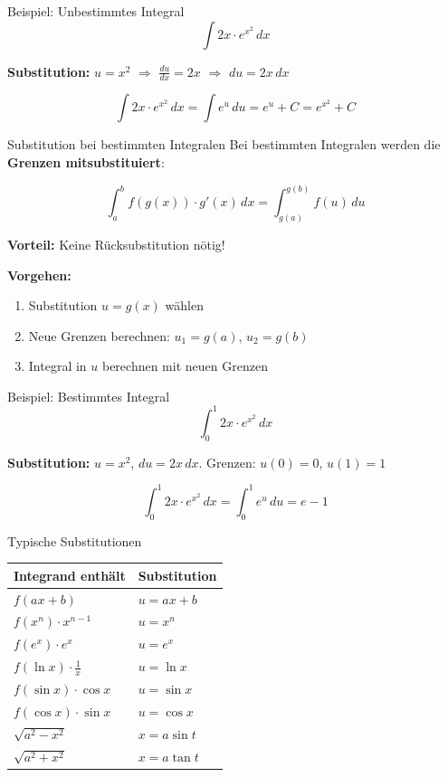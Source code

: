 \documentclass[a4paper,fontsize = 7pt]{scrartcl}
\renewcommand*{\arraystretch}{2}
\begin{document}
\begin{subbox}{Beispiel: Unbestimmtes Integral}
$$\int 2x \cdot e^{x^2}\,dx$$

\textbf{Substitution:} $u = x^2$ $\Rightarrow$ $\frac{du}{dx} = 2x$ $\Rightarrow$ $du = 2x\,dx$

$$\int 2x \cdot e^{x^2}\,dx = \int e^u\,du = e^u + C = e^{x^2} + C$$
\end{subbox}

\begin{mainbox}{Substitution bei bestimmten Integralen}
Bei bestimmten Integralen werden die \textbf{Grenzen mitsubstituiert}:

$$\boxed{\int_a^b f(g(x)) \cdot g'(x)\,dx = \int_{g(a)}^{g(b)} f(u)\,du}$$

\textbf{Vorteil:} Keine Rücksubstitution nötig!

\textbf{Vorgehen:}
\begin{enumerate}
	\item Substitution $u = g(x)$ wählen
	\item Neue Grenzen berechnen: $u_1 = g(a)$, $u_2 = g(b)$
	\item Integral in $u$ berechnen mit neuen Grenzen
\end{enumerate}
\end{mainbox}

\begin{subbox}{Beispiel: Bestimmtes Integral}
$$\int_0^1 2x \cdot e^{x^2}\,dx$$

\textbf{Substitution:} $u = x^2$, $du = 2x\,dx$. Grenzen: $u(0) = 0$, $u(1) = 1$

$$\int_0^1 2x \cdot e^{x^2}\,dx = \int_0^1 e^u\,du = e - 1$$
\end{subbox}

\begin{mainbox}{Typische Substitutionen}
\renewcommand*{\arraystretch}{1.5}
\begin{center}
\begin{tabular}{l|l}
\textbf{Integrand enthält} & \textbf{Substitution} \\
\hline
$f(ax + b)$ & $u = ax + b$ \\
$f(x^n) \cdot x^{n-1}$ & $u = x^n$ \\
$f(e^x) \cdot e^x$ & $u = e^x$ \\
$f(\ln x) \cdot \frac{1}{x}$ & $u = \ln x$ \\
$f(\sin x) \cdot \cos x$ & $u = \sin x$ \\
$f(\cos x) \cdot \sin x$ & $u = \cos x$ \\
$\sqrt{a^2 - x^2}$ & $x = a \sin t$ \\
$\sqrt{a^2 + x^2}$ & $x = a \tan t$ \\
\end{tabular}
\end{center}
\end{mainbox}
\end{document}
